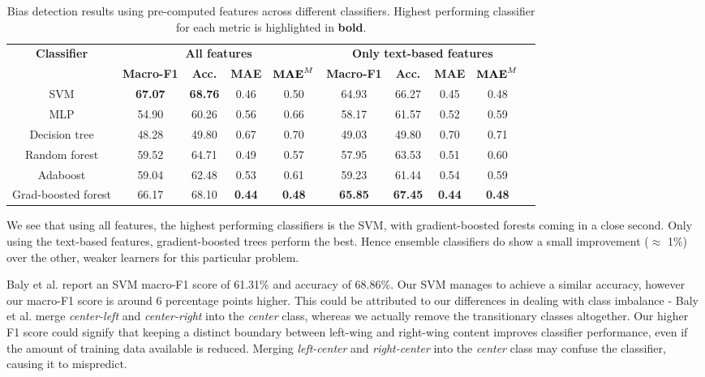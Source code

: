 \begin{table}[h]
    \centering
    \small
    \begin{adjustbox}{width=1.1\textwidth,center}
    \begin{tabular}{|c|c|c|c|c|c|c|c|c|c|}
        \hline
        \textbf{Classifier} & \multicolumn{4}{|c}{\textbf{All features}} & \multicolumn{4}{|c|}{\textbf{Only text-based features}} \\
        \cline{2-9}
         & \textbf{Macro-F1} & \textbf{Acc.} & \textbf{MAE} & $ \textrm{\textbf{MAE}}^M $ & \textbf{Macro-F1} & \textbf{Acc.} & \textbf{MAE} & $ \textrm{\textbf{MAE}}^M $ \\
         \hline
         SVM & \textbf{67.07} & \textbf{68.76} & 0.46 & 0.50 & 64.93 & 66.27 & 0.45 & 0.48  \\
         MLP & 54.90 & 60.26 & 0.56 & 0.66 & 58.17 & 61.57 & 0.52 & 0.59 \\
         Decision tree & 48.28 & 49.80 & 0.67 & 0.70 & 49.03 & 49.80 & 0.70 & 0.71 \\
         \hline
         Random forest & 59.52 & 64.71 & 0.49 & 0.57 & 57.95 & 63.53 & 0.51 & 0.60 \\
         Adaboost & 59.04 & 62.48 & 0.53 & 0.61 & 59.23 & 61.44 & 0.54 & 0.59 \\
         Grad-boosted forest & 66.17 & 68.10 & \textbf{0.44} & \textbf{0.48} & \textbf{65.85} & \textbf{67.45} & \textbf{0.44} & \textbf{0.48} \\
         \hline
    \end{tabular}
    \end{adjustbox}
    \caption{Bias detection results using pre-computed features across different classifiers. Highest performing classifier for each metric is highlighted in \textbf{bold}.}
    \label{tab:nmr-ensemble-results}
\end{table}

We see that using all features, the highest performing classifiers is the SVM, with gradient-boosted forests coming in a close second. Only using the text-based features, gradient-boosted trees perform the best. Hence ensemble classifiers do show a small improvement ($ \approx $ 1\%) over the other, weaker learners for this particular problem.


Baly et al. report an SVM macro-F1 score of 61.31\% and accuracy of 68.86\%. Our SVM manages to achieve a similar accuracy, however our macro-F1 score is around 6 percentage points higher. This could be attributed to our differences in dealing with class imbalance - Baly et al. merge \textit{center-left} and \textit{center-right} into the \textit{center} class, whereas we actually remove the transitionary classes altogether. Our higher F1 score could signify that keeping a distinct boundary between left-wing and right-wing content improves classifier performance, even if the amount of training data available is reduced. Merging \textit{left-center} and \textit{right-center} into the \textit{center} class may confuse the classifier, causing it to mispredict.

